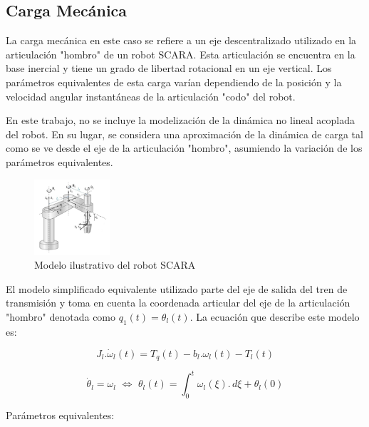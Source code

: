 \documentclass{article}
\begin{document}
\subsection{Carga Mecánica}
    
    La carga mecánica en este caso se refiere a un eje descentralizado utilizado en la articulación "hombro" 
    de un robot SCARA. Esta articulación se encuentra en la base inercial y tiene un grado de libertad 
    rotacional en un eje vertical. Los parámetros equivalentes de esta carga varían dependiendo de la posición 
    y la velocidad angular instantáneas de la articulación "codo" del robot.

    En este trabajo, no se incluye la modelización de la dinámica no lineal acoplada del robot. En su lugar, 
    se considera una aproximación de la dinámica de carga tal como se ve desde el eje de la articulación 
    "hombro", asumiendo la variación de los parámetros equivalentes.

    \begin{figure}[H]
        \centering
        \includegraphics[width=0.25\textwidth]{Alan1.jpg}
        \caption{Modelo ilustrativo del robot SCARA}
    \end{figure}

    El modelo simplificado equivalente utilizado parte del eje de salida del tren de transmisión y toma en 
    cuenta la coordenada articular del eje de la articulación "hombro" denotada como $q_1(t) = θ_l(t)$. La 
    ecuación que describe este modelo es:

    \begin{equation}\label{eq:carga_mecanica1}
        J_{l}.\dot{\omega}_{l}(t) = T_{q}(t)-b_{l}.\omega_{l}(t)-T_{l}(t)
    \end{equation}

    \begin{equation}\label{eq:carga_mecanica2}
        \dot{\theta}_{l} = \omega_{l} \,\, \Leftrightarrow \,\, \theta_{l}(t) = \int_{0}^{t} \omega_{l}(\xi). \,d\xi + \theta_{l}(0)
    \end{equation}

    Parámetros equivalentes:
\end{document}
